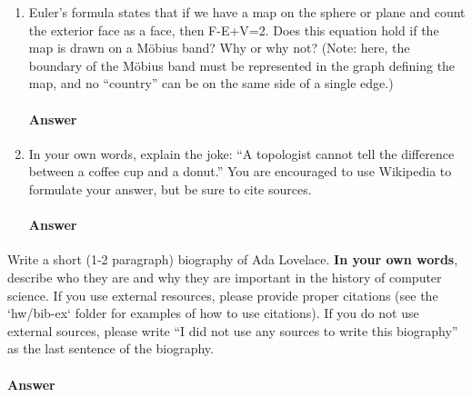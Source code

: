 \documentclass{article}
\begin{document}
\begin{enumerate}
    \item Euler's formula states that if we have a map on the sphere or plane
        and count the exterior face as a face, then F-E+V=2.  Does this equation
        hold if the map is drawn on a M\"obius band? Why or why not? (Note:
        here, the boundary of the M\"obius band must be represented in the graph
        defining the map, and no ``country'' can be on the same side of a single
        edge.)

        \paragraph{Answer}

    \item In your own words, explain the joke: ``A topologist cannot tell the
        difference between a coffee cup and a donut.''  You are encouraged to
        use Wikipedia to formulate your answer, but be sure to cite sources.

        \paragraph{Answer}

\end{enumerate}

\collab{\todo{}}

Write a short (1-2 paragraph) biography of Ada Lovelace.
\textbf{In your own words}, describe who they are and why they are important in
the history of computer science.  If you use external resources, please provide
proper citations (see the `hw/bib-ex` folder for examples of how to use
citations). If you do not use external sources, please write ``I did not
use any sources to write this biography'' as the last sentence of the
biography.

\paragraph{Answer}


% 
% 
\end{document}
